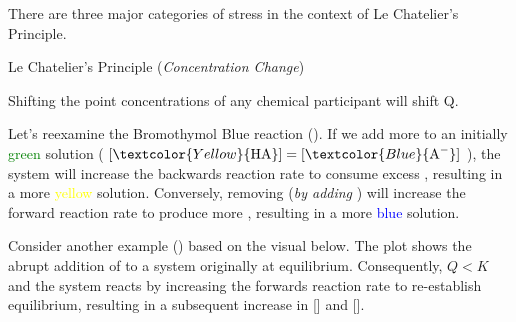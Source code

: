 \documentclass[10pt]{article}
\begin{document}
    There are three major categories of stress in the context of Le Chatelier's Principle.

    \begin{core}{Le Chatelier's Principle (\textit{Concentration Change})}
     
      Shifting the point concentrations of any chemical participant will shift Q.

      Let's reexamine the Bromothymol Blue reaction (). If we add more  to an initially \textcolor{Green}{green} solution ( $[\textcolor{Yellow}{\ce{HA}}] = [\textcolor{Blue}{\ce{A-}}]$ ), the system will increase the backwards reaction rate to consume excess , resulting in a more \textcolor{Yellow}{yellow} solution. Conversely, removing  (\textit{by adding }) will increase the forward reaction rate to  produce more , resulting in a more \textcolor{Blue}{blue} solution.

      Consider another example () based on the visual below. The plot shows the abrupt addition of  to a system originally at equilibrium. Consequently, $Q<K$ and the system reacts by increasing the forwards reaction rate to re-establish equilibrium, resulting in a subsequent increase in [] and [].

\end{core}
\end{document}
